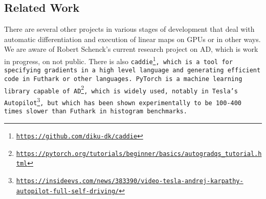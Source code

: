 \subsection{Related Work}
There are several other projects in various stages of development that deal with
automatic differentiation and execution of linear maps on GPUs or in other ways. We are
aware of Robert Schenck's current research project on AD, which is work in
progress, on not public. There is also \tt{caddie}\footnote{\url{https://github.com/diku-dk/caddie}},
which is a tool for specifying gradients in a high level language and generating
efficient code in Futhark or other languages. PyTorch is a machine learning library
capable of AD\footnote{\url{https://pytorch.org/tutorials/beginner/basics/autogradqs_tutorial.html}},
which is widely used, notably in Tesla's Autopilot\footnote{\url{https://insideevs.com/news/383390/video-tesla-andrej-karpathy-autopilot-full-self-driving/}},
but which has been shown\cite{histogrammar} experimentally to be 100-400 times slower
than Futhark in histogram benchmarks.
